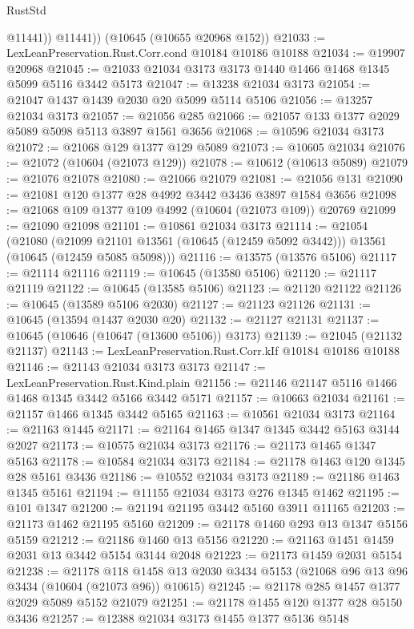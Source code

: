 \begin{lexlean}{RustStd}
\begin{coremodule}
            @11441))
        @11441))
    (@10645 (@10655 @20968 @152))
@21033 := LexLeanPreservation.Rust.Corr.cond @10184 @10186 @10188
@21034 := @19907 @20968
@21045 := @21033 @21034 @3173 @3173 @1440 @1466 @1468 @1345 @5099 @5116 @3442 @5173
@21047 := @13238 @21034 @3173
@21054 := @21047 @1437 @1439 @2030 @20 @5099 @5114 @5106
@21056 := @13257 @21034 @3173
@21057 := @21056 @285
@21066 := @21057 @133 @1377 @2029 @5089 @5098 @5113 @3897 @1561 @3656
@21068 := @10596 @21034 @3173
@21072 := @21068 @129 @1377 @129 @5089
@21073 := @10605 @21034
@21076 := @21072 (@10604 (@21073 @129))
@21078 := @10612 (@10613 @5089)
@21079 := @21076 @21078
@21080 := @21066 @21079
@21081 := @21056 @131
@21090 := @21081 @120 @1377 @28 @4992 @3442 @3436 @3897 @1584 @3656
@21098 := @21068 @109 @1377 @109 @4992 (@10604 (@21073 @109)) @20769
@21099 := @21090 @21098
@21101 := @10861 @21034 @3173
@21114 := @21054
    (@21080
      (@21099 @21101 @13561 (@10645 (@12459 @5092 @3442)))
      @13561
      (@10645 (@12459 @5085 @5098)))
@21116 := @13575 (@13576 @5106)
@21117 := @21114 @21116
@21119 := @10645 (@13580 @5106)
@21120 := @21117 @21119
@21122 := @10645 (@13585 @5106)
@21123 := @21120 @21122
@21126 := @10645 (@13589 @5106 @2030)
@21127 := @21123 @21126
@21131 := @10645 (@13594 @1437 @2030 @20)
@21132 := @21127 @21131
@21137 := @10645 (@10646 (@10647 (@13600 @5106)) @3173)
@21139 := @21045 (@21132 @21137)
@21143 := LexLeanPreservation.Rust.Corr.kIf @10184 @10186 @10188
@21146 := @21143 @21034 @3173 @3173
@21147 := LexLeanPreservation.Rust.Kind.plain
@21156 := @21146 @21147 @5116 @1466 @1468 @1345 @3442 @5166 @3442 @5171
@21157 := @10663 @21034
@21161 := @21157 @1466 @1345 @3442 @5165
@21163 := @10561 @21034 @3173
@21164 := @21163 @1445
@21171 := @21164 @1465 @1347 @1345 @3442 @5163 @3144 @2027
@21173 := @10575 @21034 @3173
@21176 := @21173 @1465 @1347 @5163
@21178 := @10584 @21034 @3173
@21184 := @21178 @1463 @120 @1345 @28 @5161 @3436
@21186 := @10552 @21034 @3173
@21189 := @21186 @1463 @1345 @5161
@21194 := @11155 @21034 @3173 @276 @1345 @1462
@21195 := @101 @1347
@21200 := @21194 @21195 @3442 @5160 @3911 @11165
@21203 := @21173 @1462 @21195 @5160
@21209 := @21178 @1460 @293 @13 @1347 @5156 @5159
@21212 := @21186 @1460 @13 @5156
@21220 := @21163 @1451 @1459 @2031 @13 @3442 @5154 @3144 @2048
@21223 := @21173 @1459 @2031 @5154
@21238 := @21178
    @118
    @1458
    @13
    @2030
    @3434
    @5153
    (@21068 @96 @13 @96 @3434 (@10604 (@21073 @96)) @10615)
@21245 := @21178 @285 @1457 @1377 @2029 @5089 @5152 @21079
@21251 := @21178 @1455 @120 @1377 @28 @5150 @3436
@21257 := @12388 @21034 @3173 @1455 @1377 @5136 @5148

\end{coremodule}
\end{lexlean}

